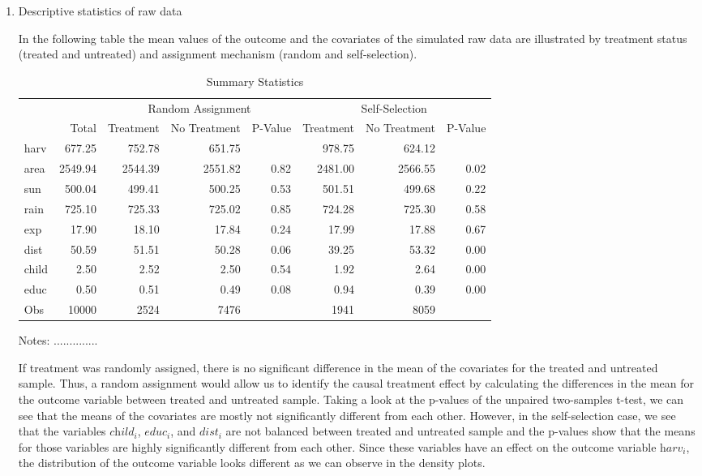 \begin{enumerate}
\item Descriptive statistics of raw data

In the following table the mean values of the outcome and the covariates of the simulated raw data are illustrated by treatment status (treated and untreated) and assignment mechanism (random and self-selection). %

\begin{table}[h!]
\centering
\begin{threeparttable}
\caption{Summary Statistics} \label{tab:data}
\begin{tabular}{lrrrrrrr}
  \hline
  & &\multicolumn{3}{c}{Random Assignment} & \multicolumn{3}{c}{Self-Selection}\\
 & Total & Treatment & No Treatment & P-Value & Treatment & No Treatment & P-Value\\
 \hline
harv & 677.25 & 752.78 & 651.75 &  & 978.75 & 624.12 &  \\ 
  area & 2549.94 & 2544.39 & 2551.82 & 0.82 & 2481.00 & 2566.55 & 0.02 \\ 
  sun & 500.04 & 499.41 & 500.25 & 0.53 & 501.51 & 499.68 & 0.22 \\ 
  rain & 725.10 & 725.33 & 725.02 & 0.85 & 724.28 & 725.30 & 0.58 \\ 
  exp & 17.90 & 18.10 & 17.84 & 0.24 & 17.99 & 17.88 & 0.67 \\ 
  dist & 50.59 & 51.51 & 50.28 & 0.06 & 39.25 & 53.32 & 0.00 \\ 
  child & 2.50 & 2.52 & 2.50 & 0.54 & 1.92 & 2.64 & 0.00 \\ 
  educ & 0.50 & 0.51 & 0.49 & 0.08 & 0.94 & 0.39 & 0.00 \\ 
  Obs & 10000 & 2524 & 7476 &  & 1941 & 8059 &  \\ 
   \hline
\end{tabular}
\end{threeparttable}
Notes: ..............
\end{table}

If treatment was randomly assigned, there is no significant difference in the mean of the covariates for the treated and untreated sample. Thus, a random assignment would allow us to identify the causal treatment effect by calculating the differences in the mean for the outcome variable between treated and untreated sample. Taking a look at the p-values of the  unpaired two-samples t-test, we can see that the means of the covariates are mostly not significantly different from each other. However, in the self-selection case, we see that the variables $\textit{child}_i$, $\textit{educ}_i$, and $\textit{dist}_i$ are not balanced between treated and untreated sample and the p-values show that the means for those variables are highly significantly different from each other. Since these variables have an effect on the outcome variable $\textit{harv}_i$, the distribution of the outcome variable looks different as we can observe in the density plots.


\end{enumerate}
